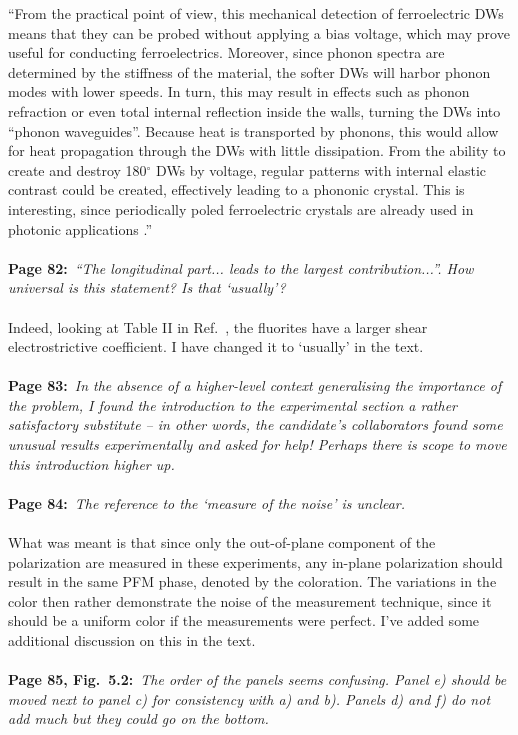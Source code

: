 \documentclass[phd, titlesmallcaps,foronline,oneside]{SNSthesis}
\begin{document}
``From the practical point of view, this mechanical detection of ferroelectric DWs means that they can be probed without applying a bias voltage, which may prove useful for conducting ferroelectrics. Moreover, since phonon spectra are determined by the stiffness of the material, the softer DWs will harbor phonon modes with lower speeds. In turn, this may result in effects such as phonon refraction or even total internal reflection inside the walls, turning the DWs into ``phonon waveguides''. Because heat is transported by phonons, this would allow for heat propagation through the DWs with little dissipation. From the ability to create and destroy 180$^\circ$ DWs by voltage, regular patterns with internal elastic contrast could be created, effectively leading to a phononic crystal.
This is interesting, since periodically poled ferroelectric crystals are already used in photonic applications \cite{Ferraro2014}.''
\\\\
{\bf Page 82:}~{\it ``The longitudinal part... leads to the largest contribution...''. How universal is this statement? Is that `usually'?}
\\\\
Indeed, looking at Table II in Ref.~\cite{Li2014}, the fluorites have a larger shear electrostrictive coefficient. I have changed it to `usually' in the text.
\\\\
{\bf Page 83:}~{\it In the absence of a higher-level context generalising the importance of the problem, I found the introduction to the experimental section a rather satisfactory substitute – in other words, the candidate’s collaborators found some unusual results experimentally and asked for help!
Perhaps there is scope to move this introduction higher up.}
\\\\
{\bf Page 84:}~{\it The reference to the `measure of the noise’ is unclear.}
\\\\
What was meant is that since only the out-of-plane component of the polarization are measured in these experiments, any in-plane polarization should result in the same PFM phase, denoted by the coloration. The variations in the color then rather demonstrate the noise of the measurement technique, since it should be a uniform color if the measurements were perfect. I've added some additional discussion on this in the text.
\\\\
{\bf Page 85, Fig.~5.2:}~{\it The order of the panels seems confusing. Panel e) should be moved next to
panel c) for consistency with a) and b). Panels d) and f) do not add much but they could go on the
bottom.}
\end{document}
